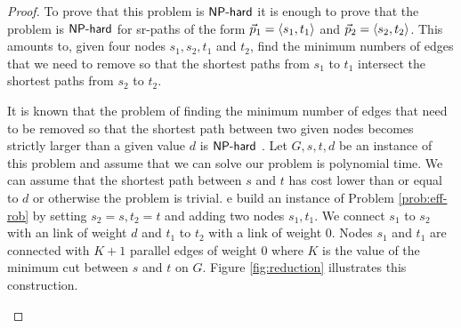 \begin{proof}
To prove that this problem is $\textsf{NP-hard}$ it is enough to prove that the problem is $\textsf{NP-hard}$ for sr-paths of the form
$\vec{p}_1 = \langle s_1, t_1 \rangle$ and $\vec{p}_2 = \langle s_2, t_2 \rangle$. This amounts to,
given four nodes $s_1, s_2, t_1$ and $t_2$, find the minimum numbers of edges that we need to remove so that
the shortest paths from $s_1$ to $t_1$ intersect the shortest paths from $s_2$ to $t_2$.

It is known that the problem of finding the minimum number of edges that need to be removed so that the shortest path
between two given nodes becomes strictly larger than a given value $d$ is $\textsf{NP-hard}$ \cite{Golovach2011PathsOB}. Let $G, s, t, d$ be an instance
of this problem and assume that we can solve our problem
is polynomial time. We can assume that the shortest path between $s$ and $t$ has cost lower than or equal to $d$ or otherwise the problem is trivial.
e build an instance of Problem \ref{prob:eff-rob} by setting $s_2 = s, t_2 = t$ and adding two
nodes $s_1, t_1$. We connect $s_1$ to $s_2$ with an link of weight $d$ and $t_1$ to $t_2$ with a link of weight
$0$. Nodes $s_1$ and $t_1$ are connected with $K + 1$ parallel edges of weight $0$ where $K$ is the value of the
minimum cut between $s$ and $t$ on $G$. Figure \ref{fig:reduction} illustrates this construction.

\begin{figure}[H]
\begin{center}
\end{center}
\end{figure}
\end{proof}

